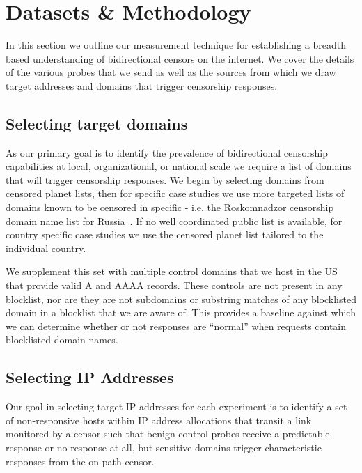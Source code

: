\section{Datasets \& Methodology}\label{sec:methodology}

In this section we outline our measurement technique for establishing a breadth
based understanding of bidirectional censors on the internet. We cover the
details of the various probes that we send as well as the sources from which we
draw target addresses and domains that trigger censorship responses.

\subsection{Selecting target domains}
\label{sec:methodology:domains}
As our primary goal is to identify the prevalence of bidirectional censorship
capabilities at local, organizational, or national scale we require a list of
domains that will trigger censorship responses. We begin by selecting domains
from censored planet lists, then for specific case studies we use more targeted
lists of domains known to be censored in specific - i.e. the Roskomnadzor
censorship domain name list for Russia~\cite{}. If no well coordinated public
list is available, for country specific case studies we use the censored planet
list tailored to the individual country.

We supplement this set with multiple control domains that we host in the US that
provide valid A and AAAA records. These controls are not present in any
blocklist, nor are they are not subdomains or substring matches of any
blocklisted domain in a blocklist that we are aware of. This provides a baseline
against which we can determine whether or not responses are ``normal'' when
requests contain blocklisted domain names.

\subsection{Selecting IP Addresses}
\label{subsec:selecting-ips}
Our goal in selecting target IP addresses for each experiment is to identify a set of
non-responsive hosts within IP address allocations that transit a link monitored
by a censor such that benign control probes receive a predictable response or no
response at all, but sensitive domains trigger characteristic responses from the
on path censor.

